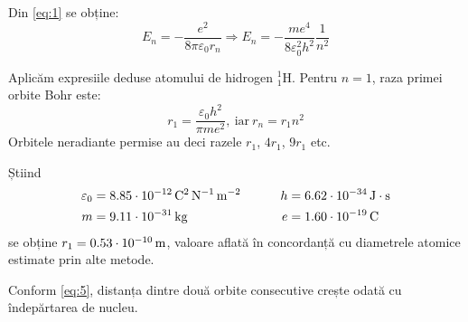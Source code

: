 Din \eqref{eq:1} se obține:
\begin{equation}
    E_n = -\frac{e^2}{8\pi\varepsilon_0 r_n}
    \Rightarrow \boxed{E_n = -\frac{me^4}{8\varepsilon_0^2 h^2} \frac{1}{n^2}}
    \label{eq:4}
\end{equation}

Aplicăm expresiile deduse atomului de hidrogen $^1_1$H.
Pentru $n = 1$, raza primei orbite Bohr este:
\begin{equation}
    r_1 = \frac{\varepsilon_0 h^2}{\pi m e^2}, ~\text{iar}~ r_n = r_1n^2
    \label{eq:5}
\end{equation}
Orbitele neradiante permise au deci razele $r_1$, $4r_1$, $9r_1$ etc.

Știind
\begin{align*}
    \varepsilon_0 &= \SI{8,85d-12}{\coulomb\tothe{2}\per\newton\per\metre\tothe{2}}
    \hspace{0.75cm}
    &h &= \SI{6,62d-34}{\joule\cdot\second}
    \\
    m &= \SI{9,11d-31}{\kilogram}
    \hspace{0.75cm}
    &e &=\SI{1,60d-19}{\coulomb}
\end{align*}
se obține \( r_1 = \SI{0,53d-10}{\metre} \), valoare aflată în concordanță cu
diametrele atomice estimate prin alte metode.

Conform \eqref{eq:5}, distanța dintre două orbite consecutive crește odată cu
îndepărtarea de nucleu.

